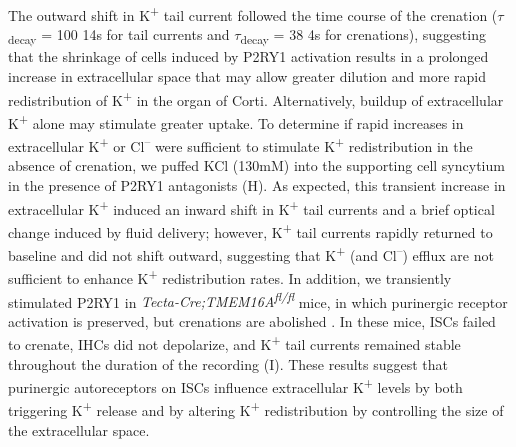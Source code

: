 \documentclass[9pt,lineno]{elife}
\begin{document}
The outward shift in K\textsuperscript{+} tail current followed the time course of the crenation ($ \tau $\textsubscript{decay} = 100 \textpm \hspace{0.2 mm} 14s for tail currents and $ \tau $\textsubscript{decay} = 38 \textpm \hspace{0.2 mm} 4s for crenations), suggesting that the shrinkage of cells induced by P2RY1 activation results in a prolonged increase in extracellular space that may allow greater dilution and more rapid redistribution of K\textsuperscript{+} in the organ of Corti. Alternatively, buildup of extracellular K\textsuperscript{+} alone may stimulate greater uptake. To determine if rapid increases in extracellular K\textsuperscript{+} or Cl\textsuperscript{--} were sufficient to stimulate K\textsuperscript{+} redistribution in the absence of crenation, we puffed KCl (130mM) into the supporting cell syncytium in the presence of P2RY1 antagonists (H). As expected, this transient increase in extracellular K\textsuperscript{+} induced an inward shift in K\textsuperscript{+} tail currents and a brief optical change induced by fluid delivery; however, K\textsuperscript{+} tail currents rapidly returned to baseline and did not shift outward, suggesting that K\textsuperscript{+} (and Cl\textsuperscript{--}) efflux are not sufficient to enhance K\textsuperscript{+} redistribution rates. In addition, we transiently stimulated P2RY1 in \textit{Tecta-Cre;TMEM16A\textsuperscript{fl/fl}} mice, in which purinergic receptor activation is preserved, but crenations are abolished \citep{Wang2015}. In these mice, ISCs failed to crenate, IHCs did not depolarize, and K\textsuperscript{+} tail currents remained stable throughout the duration of the recording (I). These results suggest that purinergic autoreceptors on ISCs influence extracellular K\textsuperscript{+} levels by both triggering K\textsuperscript{+} release and by altering K\textsuperscript{+} redistribution by controlling the size of the extracellular space.
\end{document}
